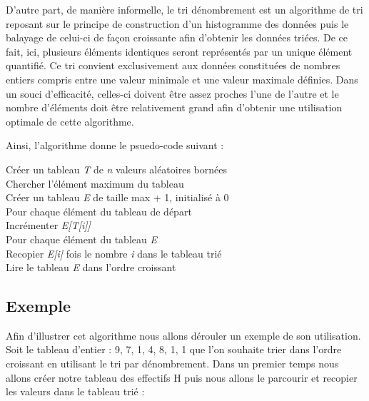 \documentclass[11pt]{article}
\begin{document}
\hspace{1.0 cm} D'autre part, de manière informelle, le tri dénombrement est un algorithme de tri reposant sur le principe de construction d'un histogramme des données puis le balayage de celui-ci de façon croissante afin d'obtenir les données triées.
De ce fait, ici, plusieurs éléments identiques seront représentés par un unique élément quantifié. Ce tri convient exclusivement aux données constituées de nombres entiers compris entre une valeur minimale et une valeur maximale définies. Dans un souci d'efficacité, celles-ci doivent être assez proches l'une de l'autre et le nombre d'éléments doit être relativement grand afin d'obtenir une utilisation optimale de cette algorithme.

Ainsi, l'algorithme donne le psuedo-code suivant : \\

\begin{tcolorbox}
Créer un tableau \textit{T} de \textit{n} valeurs aléatoires bornées\\
Chercher l'élément maximum du tableau \\
 Créer un tableau \textit{E} de taille max + 1, initialisé à 0\\

Pour chaque élément du tableau de départ\\
\hspace*{1.0 cm} Incrémenter \textit{E[T[i]] }\\

Pour chaque élément du tableau \textit{E}\\
\hspace*{1.0 cm}   Recopier \textit{E[i]} fois le nombre \textit{i} dans le tableau trié\\
Lire le tableau \textit{E} dans l'ordre croissant
\end{tcolorbox}



\newpage
\subsection{Exemple}
\hspace{1.0 cm} Afin d'illustrer cet algorithme nous allons dérouler un exemple de son utilisation.
Soit le tableau d’entier : 9, 7, 1, 4, 8, 1, 1 que l’on souhaite trier dans l’ordre croissant en utilisant le tri par dénombrement.
Dans un premier temps nous allons créer notre tableau des effectifs H puis nous allons le parcourir et recopier les valeurs dans le tableau trié :
\end{document}
